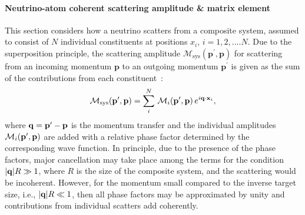 \paragraph{Neutrino-atom coherent scattering amplitude \& matrix element} 
This section considers how a neutrino scatters from a composite system, assumed to consist of $N$ individual constituents at positions $x_i,\,i=1,2,....N$. Due to the superposition principle, the scattering amplitude $\mathcal{M}_\mathrm{sys}(\mathbf{p}^\prime,\mathbf{p})$ for scattering from an incoming momentum $\mathbf{p}$ to an outgoing momentum $\mathbf{p}^\prime$ is given as the sum of the contributions from each constituent~\cite{Freedman:1977xn,Papavassiliou:2005cs}:
\begin{align}
\mathcal{M}_\mathrm{sys}(\bold{p}^\prime,\bold{p})=\sum_i^N\,\mathcal{M}_i(\bold{p}^\prime,\bold{p})\,e^{i\bold{q}\cdot\bold{x}_i},
\end{align}
where $\bold{q}=\bold{p}^\prime-\bold{p}$ is the momentum transfer and the individual amplitudes $\mathcal{M}_i(\bold{p}^\prime,\bold{p})$ are added with a relative phase factor determined by the corresponding wave function. %
In principle, due to the presence of the phase factors, major cancellation may take place among the terms for the condition $|\bold{q}|R\gg1$, where $R$ is the size of the composite system, and the scattering would be incoherent. However, for the momentum small compared to the inverse target size, i.e., $|\bold{q}|R\ll1$, then all phase factors may be approximated by unity and contributions from individual scatters add coherently. 


